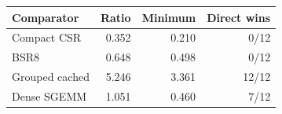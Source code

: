 \begin{tabular}{lrrr}
\toprule
Comparator & Ratio & Minimum & Direct wins \\
\midrule
Compact CSR & 0.352 & 0.210 & 0/12 \\
BSR8 & 0.648 & 0.498 & 0/12 \\
Grouped cached & 5.246 & 3.361 & 12/12 \\
Dense SGEMM & 1.051 & 0.460 & 7/12 \\
\bottomrule
\end{tabular}
